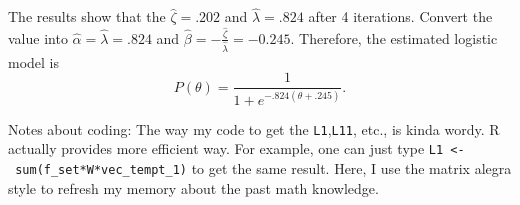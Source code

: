 \documentclass[
]{article}
\begin{document}
The results show that the \(\hat{\zeta}=.202\) and
\(\hat{\lambda}=.824\) after 4 iterations. Convert the value into
\(\hat{\alpha} = \hat{\lambda}=.824\) and
\(\hat{\beta} = -\frac{\hat{\zeta}}{\hat{\lambda}}=-0.245\). Therefore,
the estimated logistic model is
\[P(\theta)=\frac{1}{1+e^{-.824(\theta+.245)}}.\]

Notes about coding: The way my code to get the \texttt{L1},\texttt{L11},
etc., is kinda wordy. R actually provides more efficient way. For
example, one can just type
\texttt{L1\ \textless{}-\ sum(f\_set*W*vec\_tempt\_1)} to get the same
result. Here, I use the matrix alegra style to refresh my memory about
the past math knowledge.
\end{document}
